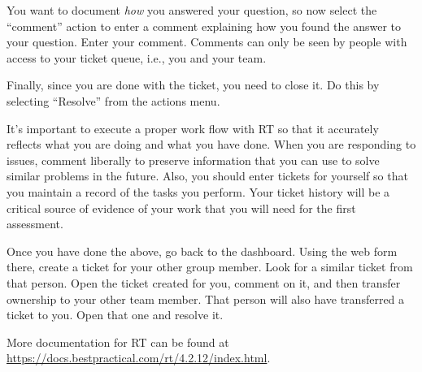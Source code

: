 \documentclass{article}
\begin{document}
You want to document \emph{how} you answered your question, so now select the ``comment'' action to enter a comment explaining how you found the answer to your question. Enter your comment. Comments can only be seen by people with access to your ticket queue, i.e., you and your team.

Finally, since you are done with the ticket, you need to close it. Do this by selecting ``Resolve'' from the actions menu. 

It's important to execute a proper work flow with RT so that it accurately reflects what you are doing and what you have done. When you are responding to issues, comment liberally to preserve information that you can use to solve similar problems in the future. Also, you should enter tickets for yourself so that you maintain a record of the tasks you perform. Your ticket history will be a critical source of evidence of your work that you will need for the first assessment.

Once you have done the above, go back to the dashboard. Using the web form there, create a ticket for your other group member. Look for a similar ticket from that person. Open the ticket created for you, comment on it, and then transfer ownership to your other team member. That person will also have transferred a ticket to you. Open that one and resolve it.

More documentation for RT can be found at \url{https://docs.bestpractical.com/rt/4.2.12/index.html}.
\end{document}
